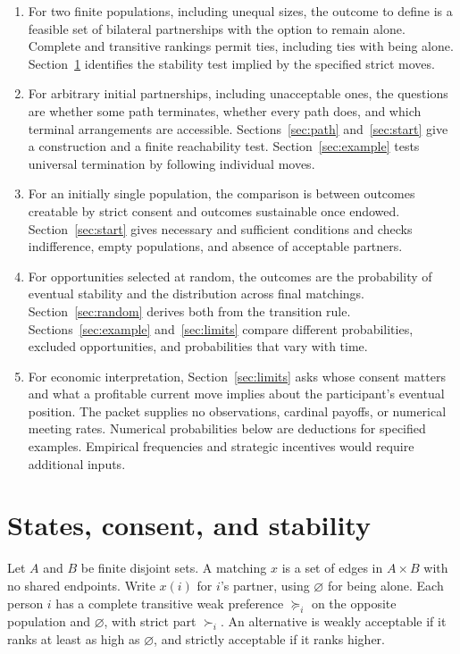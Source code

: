 \documentclass[11pt]{article}
\newcommand{\alone}{\varnothing}
\begin{document}
\begin{enumerate}
\item For two finite populations, including unequal sizes, the outcome to define is a feasible set of bilateral partnerships with the option to remain alone. Complete and transitive rankings permit ties, including ties with being alone. Section~\ref{sec:model} identifies the stability test implied by the specified strict moves.
\item For arbitrary initial partnerships, including unacceptable ones, the questions are whether some path terminates, whether every path does, and which terminal arrangements are accessible. Sections~\ref{sec:path} and~\ref{sec:start} give a construction and a finite reachability test. Section~\ref{sec:example} tests universal termination by following individual moves.
\item For an initially single population, the comparison is between outcomes creatable by strict consent and outcomes sustainable once endowed. Section~\ref{sec:start} gives necessary and sufficient conditions and checks indifference, empty populations, and absence of acceptable partners.
\item For opportunities selected at random, the outcomes are the probability of eventual stability and the distribution across final matchings. Section~\ref{sec:random} derives both from the transition rule. Sections~\ref{sec:example} and~\ref{sec:limits} compare different probabilities, excluded opportunities, and probabilities that vary with time.
\item For economic interpretation, Section~\ref{sec:limits} asks whose consent matters and what a profitable current move implies about the participant's eventual position. The packet supplies no observations, cardinal payoffs, or numerical meeting rates. Numerical probabilities below are deductions for specified examples. Empirical frequencies and strategic incentives would require additional inputs.
\end{enumerate}

\section{States, consent, and stability}\label{sec:model}

Let \(A\) and \(B\) be finite disjoint sets. A matching \(x\) is a set of edges in \(A\times B\) with no shared endpoints. Write \(x(i)\) for \(i\)'s partner, using \(\alone\) for being alone. Each person \(i\) has a complete transitive weak preference \(\succeq_i\) on the opposite population and \(\alone\), with strict part \(\succ_i\). An alternative is weakly acceptable if it ranks at least as high as \(\alone\), and strictly acceptable if it ranks higher.
\end{document}
